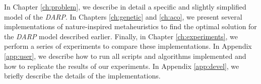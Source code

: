 

In Chapter \ref{ch:problem}, we describe in detail a specific and slightly simplified model of the \textit{DARP}. In Chapters \ref{ch:genetic} and \ref{ch:aco}, we present several implementations of nature-inspired metaheuristics to find the optimal solution for the \textit{DARP} model described earlier. Finally, in Chapter \ref{ch:experiments}, we perform a series of experiments to compare these implementations. In Appendix \ref{app:user}, we describe how to run all scripts and algorithms implemented and how to replicate the results of our experiments. In Appendix \ref{app:devel}, we briefly describe the details of the implementations.
